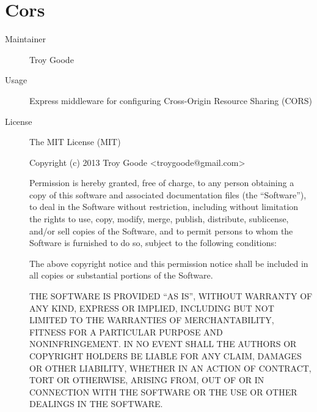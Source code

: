   \section*{Cors}
    \begin{description}
      \item[Maintainer] Troy Goode 
      \item[Usage] Express middleware for configuring Cross-Origin Resource Sharing (CORS)
      \item[License] \scriptsize The MIT License (MIT)

        Copyright (c) 2013 Troy Goode <troygoode@gmail.com>

        Permission is hereby granted, free of charge, to any person obtaining a copy of this software and associated documentation files (the ``Software''), to deal in the Software without restriction, including without limitation the rights to use, copy, modify, merge, publish, distribute, sublicense, and/or sell copies of the Software, and to permit persons to whom the Software is furnished to do so, subject to the following conditions:

        The above copyright notice and this permission notice shall be included in all copies or substantial portions of the Software.

        THE SOFTWARE IS PROVIDED ``AS IS'', WITHOUT WARRANTY OF ANY KIND, EXPRESS OR IMPLIED, INCLUDING BUT NOT LIMITED TO THE WARRANTIES OF MERCHANTABILITY, FITNESS FOR A PARTICULAR PURPOSE AND NONINFRINGEMENT. IN NO EVENT SHALL THE AUTHORS OR COPYRIGHT HOLDERS BE LIABLE FOR ANY CLAIM, DAMAGES OR OTHER LIABILITY, WHETHER IN AN ACTION OF CONTRACT, TORT OR OTHERWISE, ARISING FROM, OUT OF OR IN CONNECTION WITH THE SOFTWARE OR THE USE OR OTHER DEALINGS IN THE SOFTWARE.
    \end{description}

